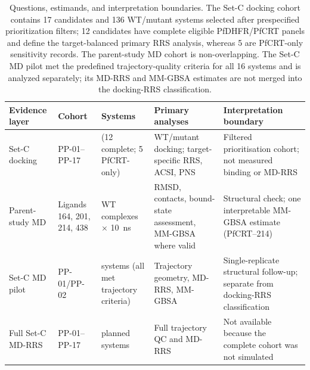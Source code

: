 \begin{table}[htbp]
\centering
\caption{Questions, estimands, and interpretation boundaries. The Set-C docking cohort contains 17 candidates and 136 WT/mutant systems selected after prespecified prioritization filters; 12 candidates have complete eligible PfDHFR/PfCRT panels and define the target-balanced primary RRS analysis, whereas 5 are PfCRT-only sensitivity records. The parent-study MD cohort is non-overlapping. The Set-C MD pilot met the predefined trajectory-quality criteria for all 16 systems and is analyzed separately; its MD-RRS and MM-GBSA estimates are not merged into the docking-RRS classification.}
\label{tab:s6_cohort_estimands}
\scriptsize
\begin{tabularx}{\textwidth}{>{\raggedright\arraybackslash}p{} >{\raggedright\arraybackslash}p{} >{\raggedright\arraybackslash}p{} >{\raggedright\arraybackslash}X >{\raggedright\arraybackslash}X}
\toprule
Evidence layer & Cohort & Systems & Primary analyses & Interpretation boundary \\
\midrule
Set-C docking & PP-01--PP-17 & 136 (12 complete; 5 PfCRT-only) & WT/mutant docking; target-specific RRS, ACSI, PNS & Filtered prioritisation cohort; not measured binding or MD-RRS \\
Parent-study MD & Ligands 164, 201, 214, 438 & 4 WT complexes $\times$ \SI{10}{\nano\second} & RMSD, contacts, bound-state assessment, MM-GBSA where valid & Structural check; one interpretable MM-GBSA estimate (PfCRT--214) \\
Set-C MD pilot & PP-01/PP-02 & 16 systems (all met trajectory criteria) & Trajectory geometry, MD-RRS, MM-GBSA & Single-replicate structural follow-up; separate from docking-RRS classification \\
Full Set-C MD-RRS & PP-01--PP-17 & 136 planned systems & Full trajectory QC and MD-RRS & Not available because the complete cohort was not simulated \\
\bottomrule
\end{tabularx}
\end{table}
